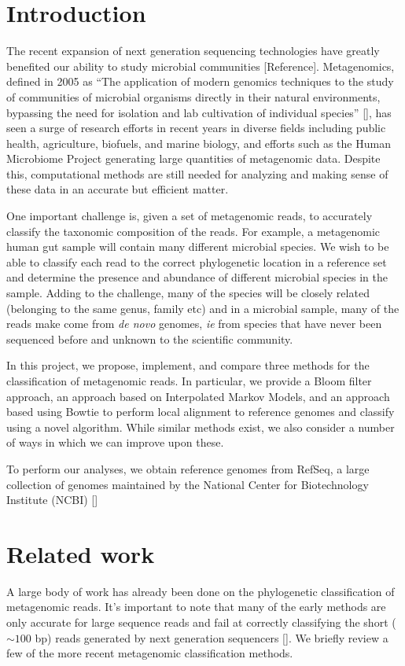 \documentclass[12pt]{article} %
\begin{document}
\section{Introduction}
The recent expansion of next generation sequencing technologies have greatly benefited our ability to study microbial communities [Reference]. Metagenomics, defined in 2005 as ``The application of modern genomics techniques to the study of communities of microbial organisms directly in their natural environments, bypassing the need for isolation and lab cultivation of individual species'' [\cite{Chen:2005dg}], has seen a surge of research efforts in recent years in diverse fields including public health, agriculture, biofuels, and marine biology, and efforts such as the Human Microbiome Project generating large quantities of metagenomic data. Despite this, computational methods are still needed for analyzing and making sense of these data in an accurate but efficient matter. 
\par
One important challenge is, given a set of metagenomic reads, to accurately classify the taxonomic composition of the reads. For example, a metagenomic human gut sample will contain many different microbial species. We wish to be able to classify each read to the correct phylogenetic location in a reference set and determine the presence and abundance of different microbial species in the sample. Adding to the challenge, many of the species will be closely related (belonging to the same genus, family etc) and in a microbial sample, many of the reads make come from \emph{de novo} genomes, \emph{ie} from species that have never been sequenced before and unknown to the scientific community. 
\par
In this project, we propose, implement, and compare three methods for the classification of metagenomic reads. In particular, we provide a Bloom filter approach, an approach based on Interpolated Markov Models, and an approach based using Bowtie to perform local alignment to reference genomes and classify using a novel algorithm. While similar methods exist, we also consider a number of ways in which we can improve upon these.
\par
To perform our analyses, we obtain reference genomes from RefSeq, a large collection of genomes maintained by the National Center for Biotechnology Institute (NCBI) [\cite{Pruitt:2009dg}] 
\section{Related work}
A large body of work has already been done on the phylogenetic classification of metagenomic reads. It's important to note that many of the early methods are only accurate for large sequence reads and fail at correctly classifying the short ($ \sim100$ bp) reads generated by next generation sequencers [\cite{Brady:2009dg}]. We briefly review a few of the more recent metagenomic classification methods.
\end{document}
